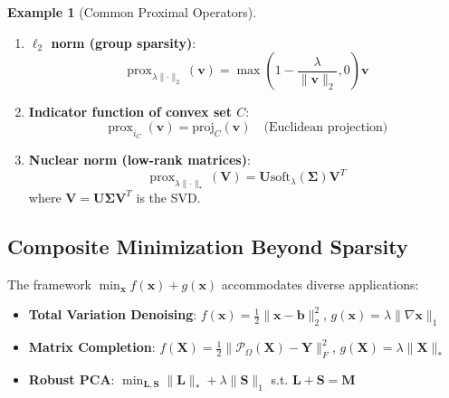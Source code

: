 \documentclass[12pt]{article}
\renewcommand{\vec}[1]{\mathbf{#1}}
\DeclareMathOperator{\prox}{prox}
\newcommand{\norm}[1]{\lVert #1 \rVert}
\theoremstyle{definition}
\newtheorem{example}{Example}[section]
\begin{document}
\begin{example}[Common Proximal Operators]
    \begin{enumerate}
        \item \textbf{$\ell_2$ norm (group sparsity)}:
              \begin{equation}
                  \prox_{\lambda\norm{\cdot}_2}(\vec{v}) = \max\left(1 - \frac{\lambda}{\norm{\vec{v}}_2}, 0\right) \vec{v}
              \end{equation}

        \item \textbf{Indicator function of convex set $C$}:
              \begin{equation}
                  \prox_{i_C}(\vec{v}) = \text{proj}_C(\vec{v}) \quad \text{(Euclidean projection)}
              \end{equation}

        \item \textbf{Nuclear norm (low-rank matrices)}:
              \begin{equation}
                  \prox_{\lambda\norm{\cdot}_*}(\vec{V}) = \vec{U}\text{soft}_\lambda(\vec{\Sigma})\vec{V}^T
              \end{equation}
              where $\vec{V} = \vec{U}\vec{\Sigma}\vec{V}^T$ is the SVD.
    \end{enumerate}
\end{example}

\subsection{Composite Minimization Beyond Sparsity}

The framework $\min_{\vec{x}} f(\vec{x}) + g(\vec{x})$ accommodates diverse applications:

\begin{itemize}[leftmargin=*]
    \item \textbf{Total Variation Denoising}: $f(\vec{x}) = \frac{1}{2}\norm{\vec{x} - \vec{b}}_2^2$, $g(\vec{x}) = \lambda\norm{\nabla \vec{x}}_1$
    \item \textbf{Matrix Completion}: $f(\vec{X}) = \frac{1}{2}\norm{\mathcal{P}_\Omega(\vec{X}) - \vec{Y}}_F^2$, $g(\vec{X}) = \lambda\norm{\vec{X}}_*$
    \item \textbf{Robust PCA}: $\min_{\vec{L},\vec{S}} \norm{\vec{L}}_* + \lambda\norm{\vec{S}}_1$ s.t. $\vec{L} + \vec{S} = \vec{M}$
\end{itemize}
\end{document}

